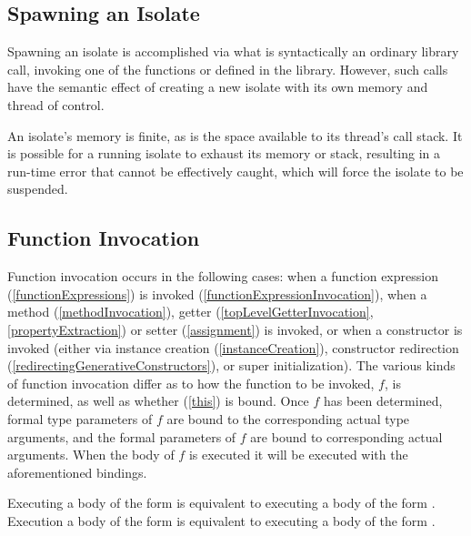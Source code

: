\documentclass[makeidx]{article}
\begin{document}
\subsection{Spawning an Isolate}

\LMHash{}%
Spawning an isolate is accomplished via what is syntactically an ordinary library call, invoking one of the functions  or  defined in the  library.
However, such calls have the semantic effect of creating a new isolate with its own memory and thread of control.

\LMHash{}%
An isolate's memory is finite, as is the space available to its thread's call stack.
It is possible for a running isolate to exhaust its memory or stack, resulting in a run-time error that cannot be effectively caught, which will force the isolate to be suspended.



\subsection{Function Invocation}

\LMHash{}%
Function invocation occurs in the following cases:
when a function expression (\ref{functionExpressions}) is invoked (\ref{functionExpressionInvocation}),
when a method (\ref{methodInvocation}), getter (\ref{topLevelGetterInvocation}, \ref{propertyExtraction}) or setter (\ref{assignment}) is invoked,
or when a constructor is invoked
(either via instance creation (\ref{instanceCreation}), constructor redirection (\ref{redirectingGenerativeConstructors}), or super initialization).
The various kinds of function invocation differ as to how the function to be invoked, $f$, is determined, as well as whether \THIS{} (\ref{this}) is bound.
Once $f$ has been determined,
formal type parameters of $f$ are bound to the corresponding actual type arguments,
and the formal parameters of $f$ are bound to corresponding actual arguments.
When the body of $f$ is executed it will be executed with the aforementioned bindings.

\LMHash{}%
Executing a body of the form  is equivalent to executing a body of the form .
Execution a body of the form  is equivalent to executing a body of the form .
\end{document}
